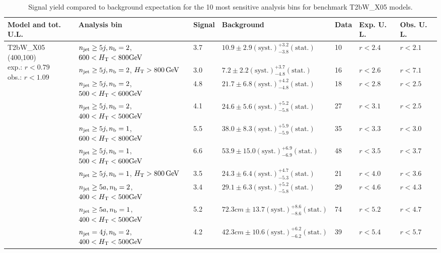 \begin{table}[h!] 
  \scriptsize
  \caption{ 
Signal yield compared to background expectation for the 10 most sensitive analysis bins 
for benchmark T2bW\_X05 models.
  \label{tab:sigBenchmarksYields_T2bW_X05}}
  \centering 
  \begin{tabular}{ lllllll } 
    \hline 
    \hline 
    Model and tot. U.L. & Analysis bin & Signal & Background & Data & Exp. U. L. & Obs. U. L. \\ \hline
\multirow{10}{*}{\parbox[t]{2.3cm}{T2bW\_X05 (400,100)\\exp.: $r<0.79$\\obs.: $r<1.09$}}
 & $n_{\mathrm{jet}} \geq5j,n_{\text{b}} =2$, $600 < \mbox{$H_\text{T}$} < 800 \mathrm{GeV}$ & 3.7 & $10.9 \pm 2.9 \mathrm{(syst.)} ^{+3.2}_{-3.8} \mathrm{(stat.)}$ & 10 & $r < 2.4$ & $r < 2.1$\\ 
 & $n_{\mathrm{jet}} \geq5j,n_{\text{b}} =2$, $\mbox{$H_\text{T}$} > 800 \, \mathrm{GeV}$ & 3.0 & $7.2 \pm 2.2 \mathrm{(syst.)} ^{+3.7}_{-4.8} \mathrm{(stat.)}$ & 16 & $r < 2.6$ & $r < 7.1$\\ 
 & $n_{\mathrm{jet}} \geq5j,n_{\text{b}} =2$, $500 < \mbox{$H_\text{T}$} < 600 \mathrm{GeV}$ & 4.8 & $21.7 \pm 6.8 \mathrm{(syst.)} ^{+4.2}_{-4.8} \mathrm{(stat.)}$ & 18 & $r < 2.8$ & $r < 2.5$\\ 
 & $n_{\mathrm{jet}} \geq5j,n_{\text{b}} =2$, $400 < \mbox{$H_\text{T}$} < 500 \mathrm{GeV}$ & 4.1 & $24.6 \pm 5.6 \mathrm{(syst.)} ^{+5.2}_{-5.8} \mathrm{(stat.)}$ & 27 & $r < 3.1$ & $r < 2.5$\\ 
 & $n_{\mathrm{jet}} \geq5j,n_{\text{b}} =1$, $600 < \mbox{$H_\text{T}$} < 800 \mathrm{GeV}$ & 5.5 & $38.0 \pm 8.3 \mathrm{(syst.)} ^{+5.9}_{-5.9} \mathrm{(stat.)}$ & 35 & $r < 3.3$ & $r < 3.0$\\ 
 & $n_{\mathrm{jet}} \geq5j,n_{\text{b}} =1$, $500 < \mbox{$H_\text{T}$} < 600 \mathrm{GeV}$ & 6.6 & $53.9 \pm 15.0 \mathrm{(syst.)} ^{+6.9}_{-6.9} \mathrm{(stat.)}$ & 48 & $r < 3.5$ & $r < 3.7$\\ 
 & $n_{\mathrm{jet}} \geq5j,n_{\text{b}} =1$, $\mbox{$H_\text{T}$} > 800 \, \mathrm{GeV}$ & 3.5 & $24.3 \pm 6.4 \mathrm{(syst.)} ^{+4.7}_{-5.3} \mathrm{(stat.)}$ & 21 & $r < 4.0$ & $r < 3.6$\\ 
 & $n_{\mathrm{jet}} \geq5a,n_{\text{b}} =2$, $400 < \mbox{$H_\text{T}$} < 500 \mathrm{GeV}$ & 3.4 & $29.1 \pm 6.3 \mathrm{(syst.)} ^{+5.2}_{-5.8} \mathrm{(stat.)}$ & 29 & $r < 4.6$ & $r < 4.3$\\ 
 & $n_{\mathrm{jet}} \geq5a,n_{\text{b}} =1$, $400 < \mbox{$H_\text{T}$} < 500 \mathrm{GeV}$ & 5.2 & $72.3cm \pm 13.7 \mathrm{(syst.)} ^{+8.6}_{-8.6} \mathrm{(stat.)}$ & 74 & $r < 5.2$ & $r < 4.7$\\ 
 & $n_{\mathrm{jet}} =4j,n_{\text{b}} =2$, $400 < \mbox{$H_\text{T}$} < 500 \mathrm{GeV}$ & 4.2 & $42.3cm \pm 10.6 \mathrm{(syst.)} ^{+6.2}_{-6.2} \mathrm{(stat.)}$ & 39 & $r < 5.4$ & $r < 5.7$\\ \hline

\end{tabular}
\end{table}
